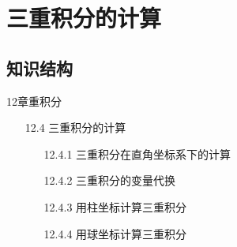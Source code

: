 \documentclass[12pt,UTF8]{ctexart}
\begin{document}
\setcounter{section}{18}
\section{三重积分的计算}
\subsection{知识结构}
12章重积分
	\begin{enumerate}
		\item[12.4]三重积分的计算
			\begin{enumerate}
				\item[12.4.1]三重积分在直角坐标系下的计算
				\item[12.4.2]三重积分的变量代换
				\item[12.4.3]用柱坐标计算三重积分
				\item[12.4.4]用球坐标计算三重积分
			\end{enumerate}
	\end{enumerate}
\end{document}

